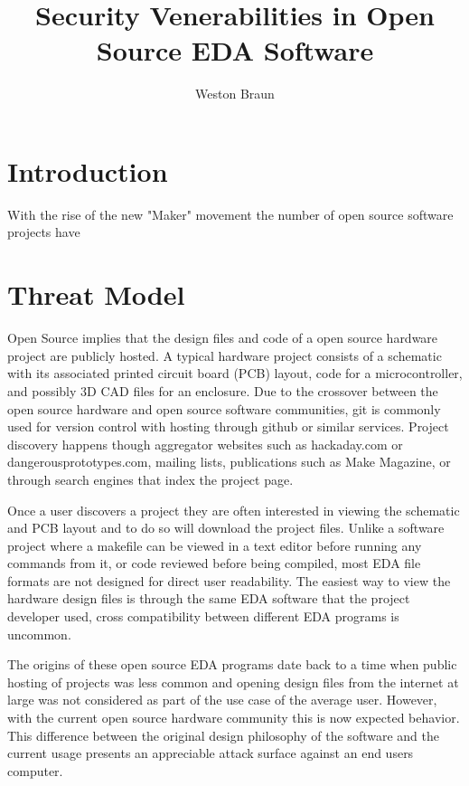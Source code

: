 \documentclass[12pt]{article}
\begin{document}
\title{Security Venerabilities in Open Source EDA Software}
\author{Weston Braun}
\maketitle

\section{Introduction}
\label{S:1}
With the rise of the new "Maker" movement the number of open source software projects have 

\section{Threat Model}
\label{S:2}
Open Source implies that the design files and code of a open source hardware project are publicly hosted. A typical hardware project consists of a schematic with its associated printed circuit board (PCB) layout, code for a microcontroller, and possibly 3D CAD files for an enclosure. Due to the crossover between the open source hardware and open source software communities, git is commonly used for version control with hosting through github or similar services. Project discovery happens though aggregator websites such as hackaday.com or dangerousprototypes.com, mailing lists, publications such as Make Magazine, or through search engines that index the project page. 

Once a user discovers a project they are often interested in viewing the schematic and PCB layout and to do so will download the project files. Unlike a software project where a makefile can be viewed in a text editor before running any commands from it, or code reviewed before being compiled, most EDA file formats are not designed for direct user readability. The easiest way to view the hardware design files is through the same EDA software that the project developer used, cross compatibility between different EDA programs is uncommon. 

The origins of these open source EDA programs date back to a time when public hosting of projects was less common and opening design files from the internet at large was not considered as part of the use case of the average user. However, with the current open source hardware community this is now expected behavior. This difference between the original design philosophy of the software and the current usage presents an appreciable attack surface against an end users computer.  
\end{document}
